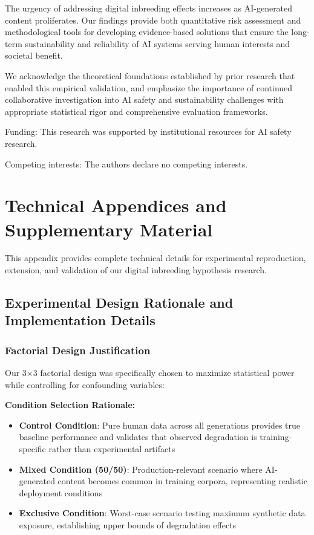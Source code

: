 \documentclass{article}
\begin{document}
The urgency of addressing digital inbreeding effects increases as AI-generated content proliferates. Our findings provide both quantitative risk assessment and methodological tools for developing evidence-based solutions that ensure the long-term sustainability and reliability of AI systems serving human interests and societal benefit.

\begin{ack}
We acknowledge the theoretical foundations established by prior research that enabled this empirical validation, and emphasize the importance of continued collaborative investigation into AI safety and sustainability challenges with appropriate statistical rigor and comprehensive evaluation frameworks.

Funding: This research was supported by institutional resources for AI safety research.

Competing interests: The authors declare no competing interests.
\end{ack}




\appendix
\section{Technical Appendices and Supplementary Material}

This appendix provides complete technical details for experimental reproduction, extension, and validation of our digital inbreeding hypothesis research.

\subsection{Experimental Design Rationale and Implementation Details}
\label{appendix:experimental_design}

\subsubsection{Factorial Design Justification}

Our 3×3 factorial design was specifically chosen to maximize statistical power while controlling for confounding variables:

\textbf{Condition Selection Rationale:}
\begin{itemize}
    \item \textbf{Control Condition}: Pure human data across all generations provides true baseline performance and validates that observed degradation is training-specific rather than experimental artifacts
    \item \textbf{Mixed Condition (50/50)}: Production-relevant scenario where AI-generated content becomes common in training corpora, representing realistic deployment conditions
    \item \textbf{Exclusive Condition}: Worst-case scenario testing maximum synthetic data exposure, establishing upper bounds of degradation effects
\end{itemize}
\end{document}
